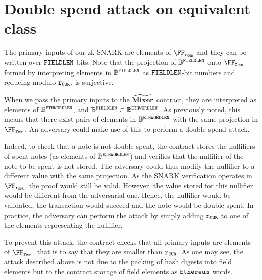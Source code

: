 
\chapter{Double spend attack on equivalent class}\label{appendix:dbspd}

The primary inputs of our zk-SNARK are elements of $\FFx{\rCURVE}$ and they can be written over $\mathtt{FIELDLEN}$ bits. Note that the projection of $\mathbb{B}^{\mathtt{FIELDLEN}}$ onto $\FFx{\rCURVE}$ formed by interpreting elements in $\mathbb{B}^{\mathtt{FIELDLEN}}$ as $\mathtt{FIELDLEN}$-bit numbers and reducing modulo $\mathtt{r_{CUR}}$, is surjective.

When we pass the primary inputs to the $\widetilde{\mathbf{Mixer}}$ contract, they are interpreted as elements of $\mathbb{B}^{\mathtt{ETHWORDLEN}}$, and $\mathbb{B}^{\mathtt{FIELDLEN}} \subset \mathbb{B}^{\mathtt{ETHWORDLEN}}$. As previously noted, this means that there exist pairs of elements in $\mathbb{B}^{\mathtt{ETHWORDLEN}}$ with the same projection in $\FFx{\rCURVE}$. An adversary could make use of this to perform a double spend attack.

Indeed, to check that a note is not double spent, the contract stores the nullifiers of spent notes (as elements of $\mathbb{B}^{\mathtt{ETHWORDLEN}}$) and verifies that the nullifier of the note to be spent is not stored. The adversary could thus modify the nullifier to a different value with the same projection. As the SNARK verification operates in $\FFx{\rCURVE}$, the proof would still be valid. However, the value stored for this nullifier would be different from the adversarial one. Hence, the nullifier would be validated, the transaction would succeed and the note would be double spent.
In practice, the adversary can perform the attack by simply adding $\mathtt{r_{CUR}}$ to one of the elements representing the nullifier.

To prevent this attack, the contract checks that all primary inputs are elements of $\FFx{\rCURVE}$, that is to say that they are smaller than $\mathtt{r_{CUR}}$.
As one may see, the attack described above is not due to the packing of hash digests into field elements but to the contract storage of field elements as $\texttt{Ethereum}$ words.
